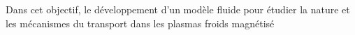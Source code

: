 Dans cet objectif, le développement d'un modèle fluide pour étudier la nature et
les mécanismes du transport dans les plasmas froids magnétisé

